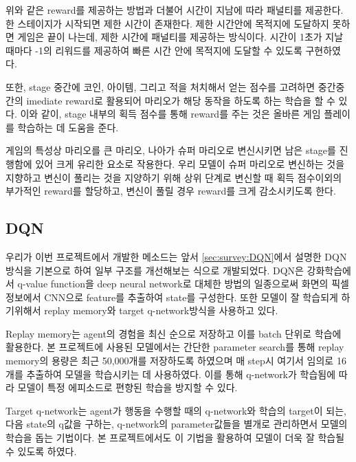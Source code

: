 위와 같은 reward를 제공하는 방법과 더불어 시간이 지남에 따라 패널티를 제공한다. 
한 스테이지가 시작되면 제한 시간이 존재한다. 
제한 시간안에 목적지에 도달하지 못하면 게임은 끝이 나는데, 제한 시간에 패널티를 제공하는 방식이다. 
시간이 1초가 지날 때마다 -1의 리워드를 제공하여 빠른 시간 안에 목적지에 도달할 수 있도록 구현하였다. 

또한, stage 중간에 코인, 아이템, 그리고 적을 처치해서 얻는 점수를 고려하면 중간중간의 imediate reward로 활용되어 마리오가 해당 동작을 하도록 하는 학습을 할 수 있다.
이와 같이, stage 내부의 획득 점수를 통해 reward를 주는 것은 올바른 게임 플레이를 학습하는 데 도움을 준다.

게임의 특성상 마리오를 큰 마리오, 나아가 슈퍼 마리오로 변신시키면 남은 stage를 진행함에 있어 크게 유리한 요소로 작용한다.
우리 모델이 슈퍼 마리오로 변신하는 것을 지향하고 변신이 풀리는 것을 지양하기 위해 상위 단계로 변신할 때 획득 점수이외의 부가적인 reward를 할당하고, 변신이 풀릴 경우 reward를 크게 감소시키도록 한다.

\subsection{DQN}
\label{sec:method:dqn}
우리가 이번 프로젝트에서 개발한 메소드는 앞서 \ref{sec:survey:DQN}에서 설명한 DQN방식을 기본으로 하여 일부 구조를 개선해보는 식으로 개발되었다.
DQN은 강화학습에서 q-value function을 deep neural network로 대체한 방법의 일종으로써 화면의 픽셀 정보에서 CNN으로 feature를 추출하여 state를 구성한다.
또한 모델이 잘 학습되게 하기위해서 replay memory와 target q-network방식을 사용하고 있다.

Replay memory는 agent의 경험을 최신 순으로 저장하고 이를 batch 단위로 학습에 활용한다.
본 프로젝트에 사용된 모델에서는 간단한 parameter search를 통해 replay memory의 용량은 최근 50,000개를 저장하도록 하였으며 매 step시 여기서 임의로 16개를 추출하여 모델을 학습시키는 데 사용하였다.
이를 통해 q-network가 학습됨에 따라 모델이 특정 에피소드로 편향된 학습을 방지할 수 있다.

Target q-network는 agent가 행동을 수행할 때의 q-network와 학습의 target이 되는, 다음 state의 q값을 구하는, q-network의 parameter값들을 별개로 관리하면서 모델의 학습을 돕는 기법이다.
본 프로젝트에서도 이 기법을 활용하여 모델이 더욱 잘 학습될 수 있도록 하였다.


